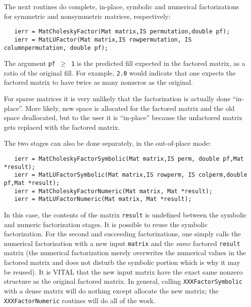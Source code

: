 The next routines do complete, in-place, symbolic and numerical 
factorizations for symmetric and nonsymmetric matrices, respectively:
\begin{verbatim}
   ierr = MatCholeskyFactor(Mat matrix,IS permutation,double pf);
   ierr = MatLUFactor(Mat matrix,IS rowpermutation, IS columnpermutation, double pf); 
\end{verbatim}
The argument {\tt pf $ \ge $ 1} is the predicted fill
expected in the factored matrix, as a ratio of the original fill. 
For example, {\tt 2.0} would indicate that one expects the factored
matrix to have twice as many nonzeros as the original.
 

\begin{design}
For sparse matrices it is very unlikely that the factorization 
is actually done ``in-place''. More likely, new space is allocated 
for the factored matrix and the old space deallocated, but to the 
user it is ``in-place'' because the unfactored matrix gets replaced with 
the factored matrix.
\end{design}

The 
two  
stages  
can also be done separately, in the out-of-place mode:
\begin{verbatim}
   ierr = MatCholeskyFactorSymbolic(Mat matrix,IS perm, double pf,Mat *result);
   ierr = MatLUFactorSymbolic(Mat matrix,IS rowperm, IS colperm,double pf,Mat *result);
   ierr = MatCholeskyFactorNumeric(Mat matrix, Mat *result);
   ierr = MatLUFactorNumeric(Mat matrix, Mat *result);
\end{verbatim}
In this case, the contents of the matrix {\tt result} is undefined between 
the symbolic and numeric factorization stages. 
It is possible to reuse the symbolic factorization. For the second and 
succeeding factorizations, one simply calls the numerical factorization with a 
new input {\tt matrix} and the {\em same} factored {\tt result} matrix
(the numerical factorization merely overwrites the numerical values in the 
factored matrix and does not disturb the symbolic portion which is why 
it may be reused).
It is VITAL that the new input matrix have the 
exact same nonzero structure as the original factored matrix.
In general, calling {\tt XXXFactorSymbolic} with a dense matrix will 
do nothing except allocate the new matrix; the {\tt XXXFactorNumeric} 
routines will do all of the work. 

